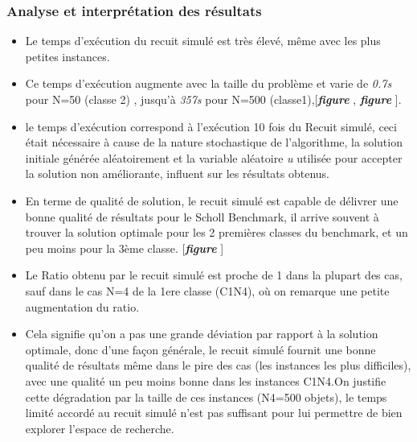 \documentclass[12pt]{article}
\begin{document}
\subsubsection{Analyse et interprétation des résultats}
\begin{itemize}
    \item Le temps d’exécution du recuit simulé est très élevé, même avec les plus petites instances. 
    \item Ce temps d’exécution augmente avec la taille du problème et varie de \emph{0.7s} pour N=50 (classe 2) , jusqu’à \emph{357s} pour N=500 (classe1),[\textbf{\emph{figure }} , \textbf{\emph{figure }}].
    \item le temps d’exécution correspond à l’exécution 10 fois du Recuit simulé, ceci était nécessaire à cause de la nature stochastique de l’algorithme,  la solution initiale générée aléatoirement et la variable aléatoire \emph{u} utilisée pour accepter la solution non améliorante, influent sur les résultats obtenus.
    \item En terme de qualité de solution, le recuit simulé est capable de délivrer une bonne qualité de résultats pour le Scholl Benchmark, il arrive souvent à trouver la solution optimale pour les 2 premières classes du benchmark, et un peu moins pour la 3ème classe. [\textbf{\emph{figure }}]
    \item Le Ratio obtenu par le recuit simulé est proche de 1 dans la plupart des cas, sauf dans le cas N=4 de la 1ere classe (C1N4), où on remarque une petite augmentation du ratio. 
    \item Cela signifie qu’on a pas une grande déviation par rapport à la solution optimale, donc d’une façon générale, le recuit simulé fournit une bonne qualité de résultats même dans le pire des cas (les instances les plus difficiles), avec une qualité un peu moins bonne dans les instances C1N4.On justifie cette dégradation par la taille de ces instances (N4=500 objets), le temps limité accordé au recuit simulé n’est pas suffisant pour lui permettre de bien explorer l’espace de recherche. 

\end{itemize}
\end{document}
